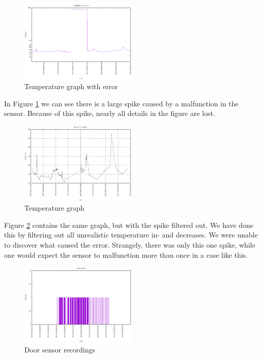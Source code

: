 \documentclass{below-ext}
\begin{document}
\begin{figure}
\centering
\includegraphics[width=0.5\textwidth]{temperror}
\caption{Temperature graph with error}
\label{fig:temperror}
\end{figure}

In  Figure \ref{fig:temperror} we can see there is a large spike caused by a malfunction in the sensor. Because of this spike, nearly all details in the figure are lost.

\begin{figure}
\centering
\includegraphics[width=0.5\textwidth]{graph}
\caption{Temperature graph}
\label{fig:temp}
\end{figure}

Figure  \ref{fig:temp} contains the same graph, but with the spike filtered out. We have done this by filtering out all unrealistic temperature in- and decreases. We were unable to discover what caused the error. Strangely, there was only this one spike, while one would expect the sensor to malfunction more than once in a case like this.

\begin{figure}
\centering
\includegraphics[width=0.5\textwidth]{doorsensor}
\caption{Door sensor recordings}
\label{fig:doorsensor}
\end{figure}
\end{document}
